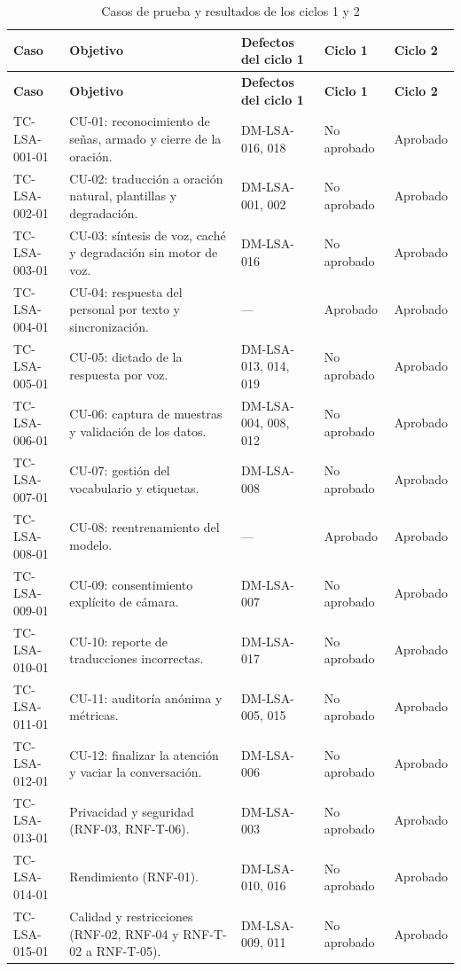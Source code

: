 \begin{longtable}{>{\raggedright\arraybackslash}p{3.0cm} >{\raggedright\arraybackslash}p{4.3cm} >{\raggedright\arraybackslash}p{2.7cm} >{\raggedright\arraybackslash}p{1.9cm} >{\raggedright\arraybackslash}p{1.9cm}}
  \caption{Casos de prueba y resultados de los ciclos 1 y 2}\label{tab:casos}\\
  \toprule
  \textbf{Caso} & \textbf{Objetivo} & \textbf{Defectos del ciclo 1} & \textbf{Ciclo 1} & \textbf{Ciclo 2} \\
  \midrule
  \endfirsthead
  \toprule
  \textbf{Caso} & \textbf{Objetivo} & \textbf{Defectos del ciclo 1} & \textbf{Ciclo 1} & \textbf{Ciclo 2} \\
  \midrule
  \endhead
  TC-LSA-001-01 & CU-01: reconocimiento de señas, armado y cierre de la oración. & DM-LSA-016, 018 & No aprobado & Aprobado \\
  TC-LSA-002-01 & CU-02: traducción a oración natural, plantillas y degradación. & DM-LSA-001, 002 & No aprobado & Aprobado \\
  TC-LSA-003-01 & CU-03: síntesis de voz, caché y degradación sin motor de voz. & DM-LSA-016 & No aprobado & Aprobado \\
  TC-LSA-004-01 & CU-04: respuesta del personal por texto y sincronización. & --- & Aprobado & Aprobado \\
  TC-LSA-005-01 & CU-05: dictado de la respuesta por voz. & DM-LSA-013, 014, 019 & No aprobado & Aprobado \\
  TC-LSA-006-01 & CU-06: captura de muestras y validación de los datos. & DM-LSA-004, 008, 012 & No aprobado & Aprobado \\
  TC-LSA-007-01 & CU-07: gestión del vocabulario y etiquetas. & DM-LSA-008 & No aprobado & Aprobado \\
  TC-LSA-008-01 & CU-08: reentrenamiento del modelo. & --- & Aprobado & Aprobado \\
  TC-LSA-009-01 & CU-09: consentimiento explícito de cámara. & DM-LSA-007 & No aprobado & Aprobado \\
  TC-LSA-010-01 & CU-10: reporte de traducciones incorrectas. & DM-LSA-017 & No aprobado & Aprobado \\
  TC-LSA-011-01 & CU-11: auditoría anónima y métricas. & DM-LSA-005, 015 & No aprobado & Aprobado \\
  TC-LSA-012-01 & CU-12: finalizar la atención y vaciar la conversación. & DM-LSA-006 & No aprobado & Aprobado \\
  TC-LSA-013-01 & Privacidad y seguridad (RNF-03, RNF-T-06). & DM-LSA-003 & No aprobado & Aprobado \\
  TC-LSA-014-01 & Rendimiento (RNF-01). & DM-LSA-010, 016 & No aprobado & Aprobado \\
  TC-LSA-015-01 & Calidad y restricciones (RNF-02, RNF-04 y RNF-T-02 a RNF-T-05). & DM-LSA-009, 011 & No aprobado & Aprobado \\
  \bottomrule
\end{longtable}


